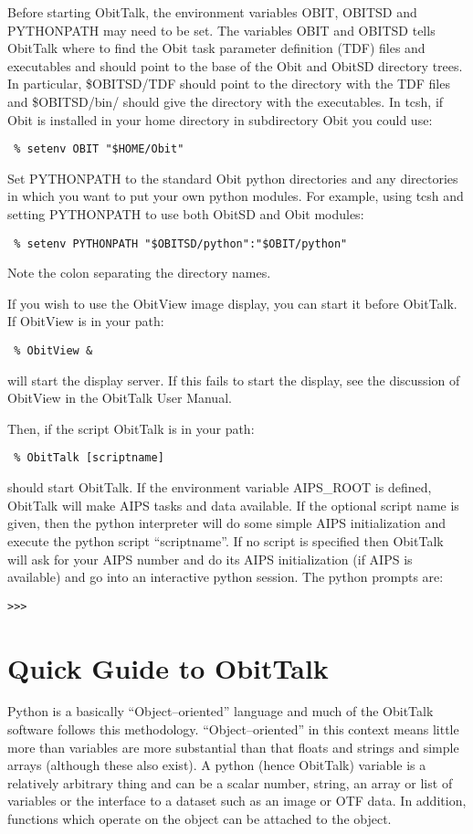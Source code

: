 \documentclass[11pt]{report}
\begin{document}
Before starting ObitTalk, the environment variables OBIT, OBITSD and
PYTHONPATH may need to be set.
The variables OBIT and OBITSD tells ObitTalk where to find the Obit
task parameter definition (TDF) files and executables and should point
to the base of the Obit and ObitSD directory trees.
In particular, \$OBITSD/TDF should point to the directory with the TDF
files and \$OBITSD/bin/ should give the directory with the
executables.
In tcsh, if Obit is installed in your home directory in subdirectory
Obit you could use:
\begin{verbatim}
 % setenv OBIT "$HOME/Obit"
\end{verbatim}
Set PYTHONPATH to the standard Obit python directories and any
directories in which you want to put your own python modules.
For example, using tcsh and setting PYTHONPATH to use both ObitSD and
Obit modules:
\begin{verbatim}
 % setenv PYTHONPATH "$OBITSD/python":"$OBIT/python"
\end{verbatim}
Note the colon separating the directory names.

If you wish to use the ObitView image display, you can start it before
ObitTalk.
If ObitView is in your path:
\begin{verbatim}
 % ObitView &
\end{verbatim}
will start the display server.
If this fails to start the display, see the discussion of ObitView in
the ObitTalk User Manual.

Then, if the script ObitTalk is in your path:
\begin{verbatim}
 % ObitTalk [scriptname]
\end{verbatim}
should start ObitTalk.
If the environment variable AIPS\_ROOT is defined, ObitTalk will
make AIPS tasks and data available.
If the optional script name is given, then the python interpreter will
do some simple AIPS initialization and execute the python script
``scriptname''. 
If no script is specified then ObitTalk will ask for your AIPS number
and do its AIPS initialization (if AIPS is available) and go into an
interactive python session.
The python prompts are: \begin{verbatim}>>> \end{verbatim}

\section {Quick Guide to ObitTalk}
Python is a basically ``Object--oriented'' language and much of the
ObitTalk software follows this methodology.
``Object--oriented'' in this context means little more than variables
are more substantial than that floats and strings and simple arrays
(although these also exist).
A python (hence ObitTalk) variable is a relatively arbitrary thing and
can be a scalar number, string, an array or list of variables or the
interface to a dataset such as an image or OTF data.
In addition, functions which operate on the object can be attached to
the object.
\end{document}
